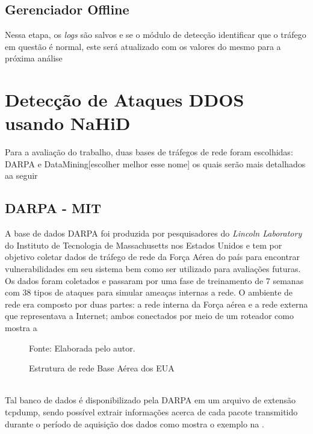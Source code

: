\subsection{Gerenciador Offline}
Nessa etapa, os \textit{logs} são salvos e se o módulo de detecção identificar que o tráfego em questão é normal, este será atualizado com os valores do mesmo para a próxima análise

\section{Detecção de Ataques DDOS usando NaHiD}
\label{Sec:NaHiD_VERC}
Para a avaliação do trabalho, duas bases de tráfegos de rede foram escolhidas: DARPA e  DataMining[escolher melhor esse nome] os quais serão mais detalhados aa seguir 
\subsection{DARPA - MIT}
 A base de dados DARPA foi produzida por pesquisadores do \textit{Lincoln Laboratory} do Instituto de Tecnologia de Massachusetts nos Estados Unidos e tem por objetivo coletar dados de tráfego de rede da Força Aérea do país para encontrar vulnerabilidades em seu sistema bem como ser utilizado para avaliações futuras. Os dados foram coletados e passaram por uma fase de treinamento de 7 semanas com 38 tipos de ataques para simular ameaças internas a rede. O ambiente de rede era composto por duas partes: a rede interna da Força aérea e a rede externa que representava a Internet; ambos conectados por meio de um roteador como mostra a 
 \begin{figure}[!htb]
	\caption{Estrutura de rede Base Aérea dos EUA }
	{Fonte: Elaborada pelo autor.}
	\label{fig:DARPA_Estrututra}
\end{figure}
\\
Tal banco de dados é disponibilizado pela DARPA em um arquivo de extensão tcpdump, sendo possível extrair informações acerca de cada pacote transmitido durante o período de aquisição dos dados como mostra o exemplo na .

